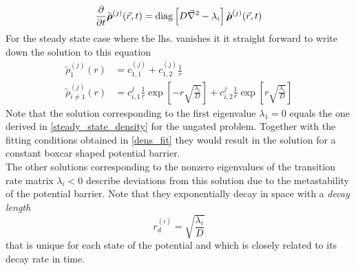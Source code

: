\begin{equation}
    \frac{\partial }{\partial t} \tilde{\boldsymbol{\mathbf{\rho}}}^{(j)}(\vec{r},t) = {\rm diag} \left[D \vec{\nabla}^{2} - \lambda_i  \right] \tilde{\boldsymbol{\mathbf{\rho}}}^{(j)}(\vec{r},t)
    \label{fpmeq4}
\end{equation}
For the steady state case where the lhs. vanishes it it straight forward to write down the solution to this equation
\begin{align}
    \tilde{\rho}_{1}^{(j)}(r) &= c_{1,1}^{(j)} + c_{1,2}^{(j)} \frac{1}{r} \nonumber \\
    \tilde{\rho}_{i \ne 1}^{(j)}(r) &= c_{i,1}^{j}\frac{1}{r} \exp\left[-r\sqrt{\frac{\lambda_i}{D}}\right] + c_{i,2}^{j}\frac{1}{r} \exp\left[r\sqrt{\frac{\lambda_i}{D}}\right] 
    \label{fp_ind_sol}
\end{align}
Note that the solution corresponding to the first eigenvalue $\lambda_1 = 0$ equals the one derived in \eqref{steady_state_density} for the ungated problem. Together with the fitting conditions obtained in \eqref{dens_fit} they would result in the solution for a constant boxcar shaped potential barrier. \\
The other solutions corresponding to the nonzero eigenvalues of the transition rate matrix $\lambda_i<0$ describe deviations from this solution due to the metastability of the potential barrier. Note that they exponentially decay in space with a \textit{decay length}
\begin{equation}
    r_d^{(i)} = \sqrt{\frac{\lambda_i}{D}}
    \label{decay_length}
\end{equation}
that is unique for each state of the potential and which is closely related to its decay rate in time.
